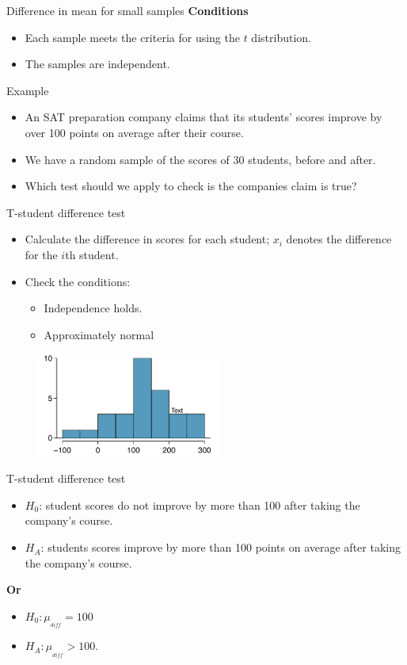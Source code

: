 \documentclass[12pt,a4paper]{beamer}
\begin{document}
\begin{frame}{Difference in mean for small samples}
	\textbf{Conditions }
	\begin{itemize}
	\item Each sample meets the criteria for using the $t$ distribution.
	\item The samples are independent.
\end{itemize}
\end{frame}
\begin{frame}{Example}
	\begin{itemize}
	\item An SAT preparation company claims that its students' scores improve by over 100 points on average after their course.
	\item We have a random sample of the scores of $30$ students, before and after.
	\item Which test should we apply to check is the companies claim is true?
\end{itemize}
\end{frame}
\begin{frame}{T-student difference test}
	\begin{itemize}
		\item Calculate the difference in scores for each student; $x_i$ denotes the difference for the $i$th student.
		\item Check the conditions:
		\begin{itemize}
			\item Independence holds.
			\item Approximately normal
				\end{itemize}
			\end{itemize}
			\begin{figure}[h]
			\centering
			\includegraphics[width=0.54\textwidth]{figures/satImprovementHTDataHistogram/satImprovementHTDataHistogram}
			\end{figure}
	
\end{frame}
\begin{frame}{T-student difference test}
	\begin{itemize}
		\item $H_0$: student scores do not improve by more than 100 after taking the company's course. 
		\item  $H_A$: students scores improve by more than 100 points on average after taking the company's course. 
	\end{itemize}
	\textbf{Or}
	\begin{itemize}
		\item	$H_0:\mu_{_{diff}} = 100$ 
		\item $H_A:\mu_{_{diff}} > 100$.
	\end{itemize}
\end{frame}
\end{document}
